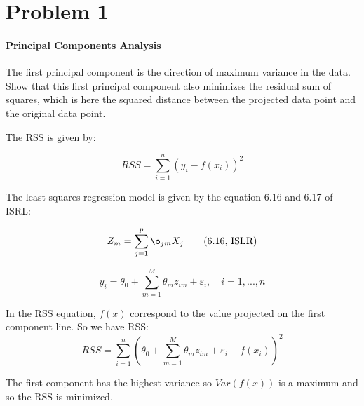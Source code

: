 \section*{Problem 1}

\paragraph{Principal Components Analysis}
The first principal component is the direction of maximum variance in the data. Show that this first principal component also minimizes the residual sum of squares, which is here the squared distance between the projected data point and the original data point.

The RSS is given by: 

\[ RSS = \sum_{i = 1}^{n}(y_i - f(x_i))^2 \]

The least squares regression model is given by the equation 6.16 and 6.17 of ISRL: 

\[ 
	Z_m = \sum_{j = 1}^{p}\o_{jm} X_j \tag{6.16, ISLR} \label{6.16}
 \]

\[ 
	y_i = \theta_0 + \sum_{m = 1}^{M} \theta_m z_{im} + \varepsilon_i,\quad i = 1,...,n \tag{6.17, ISLR} \label{6.17} 
\]

In the RSS equation, $f(x)$ correspond to the value projected on the first component line.
So we have RSS:  
\[ 
	RSS = \sum_{i = 1}^{n}(\theta_0 + \sum_{m = 1}^{M} \theta_m z_{im} + \varepsilon_i - f(x_i))^2
 \]
 
 
 The first component has the highest variance so $Var(f(x))$ is a maximum and so the RSS is minimized. 